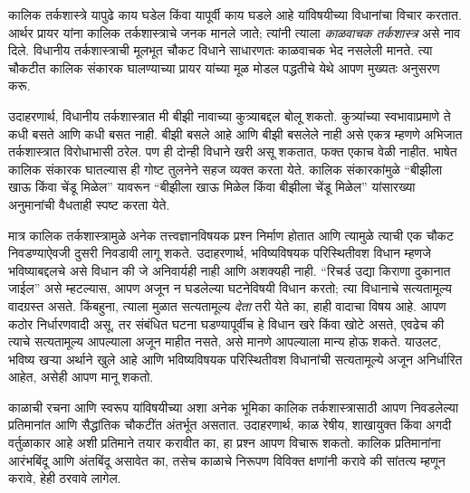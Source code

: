 \documentclass[../../../include/open-logic-section]{subfiles}
\begin{document}


कालिक तर्कशास्त्रे यापुढे काय घडेल किंवा यापूर्वी
काय घडले आहे यांविषयीच्या विधानांचा विचार करतात.
आर्थर प्रायर यांना कालिक तर्कशास्त्राचे जनक मानले
जाते; त्यांनी त्याला \emph{काळवाचक तर्कशास्त्र}
असे नाव दिले. विधानीय तर्कशास्त्राची मूलभूत चौकट
विधाने साधारणतः काळवाचक भेद नसलेली मानते. त्या
चौकटीत कालिक संकारक घालण्याच्या प्रायर यांच्या
मूळ मोडल पद्धतीचे येथे आपण मुख्यतः अनुसरण करू.

उदाहरणार्थ, विधानीय तर्कशास्त्रात मी बीझी नावाच्या
कुत्र्याबद्दल बोलू शकतो. कुत्र्यांच्या स्वभावाप्रमाणे
ते कधी बसते आणि कधी बसत नाही. बीझी बसले आहे
आणि बीझी बसलेले नाही असे एकत्र म्हणणे अभिजात
तर्कशास्त्रात विरोधाभासी ठरेल. पण ही दोन्ही विधाने
खरी असू शकतात, फक्त एकाच वेळी नाहीत. भाषेत
कालिक संकारक घातल्यास ही गोष्ट तुलनेने सहज
व्यक्त करता येते. कालिक संकारकांमुळे ``बीझीला
खाऊ किंवा चेंडू मिळेल'' यावरून ``बीझीला खाऊ
मिळेल किंवा बीझीला चेंडू मिळेल'' यांसारख्या
अनुमानांची वैधताही स्पष्ट करता येते.

मात्र कालिक तर्कशास्त्रामुळे अनेक तत्त्वज्ञानविषयक
प्रश्न निर्माण होतात आणि त्यामुळे त्याची एक चौकट
निवडण्याऐवजी दुसरी निवडावी लागू शकते. उदाहरणार्थ,
भविष्यविषयक परिस्थितीवश विधान म्हणजे भविष्याबद्दलचे
असे विधान की जे अनिवार्यही नाही आणि अशक्यही नाही.
``रिचर्ड उद्या किराणा दुकानात जाईल'' असे म्हटल्यास,
आपण अजून न घडलेल्या घटनेविषयी विधान करतो; त्या
विधानाचे सत्यतामूल्य वादग्रस्त असते. किंबहुना,
त्याला मुळात सत्यतामूल्य \emph{देता} तरी येते का,
हाही वादाचा विषय आहे. आपण कठोर निर्धारणवादी
असू, तर संबंधित घटना घडण्यापूर्वीच हे विधान
खरे किंवा खोटे असते, एवढेच की त्याचे सत्यतामूल्य
आपल्याला अजून माहीत नसते, असे मानणे आपल्याला
मान्य होऊ शकते. याउलट, भविष्य खऱ्या अर्थाने
खुले आहे आणि भविष्यविषयक परिस्थितीवश विधानांची
सत्यतामूल्ये अजून अनिर्धारित आहेत, असेही आपण
मानू शकतो.

काळाची रचना आणि स्वरूप यांविषयीच्या अशा अनेक
भूमिका कालिक तर्कशास्त्रासाठी आपण निवडलेल्या
प्रतिमानांत आणि सैद्धांतिक चौकटींत अंतर्भूत असतात.
उदाहरणार्थ, काळ रेषीय, शाखायुक्त किंवा अगदी
वर्तुळाकार आहे अशी प्रतिमाने तयार करावीत का,
हा प्रश्न आपण विचारू शकतो. कालिक प्रतिमानांना
आरंभबिंदू आणि अंतबिंदू असावेत का, तसेच काळाचे
निरूपण विविक्त क्षणांनी करावे की सांतत्य म्हणून
करावे, हेही ठरवावे लागेल.
\end{document}
